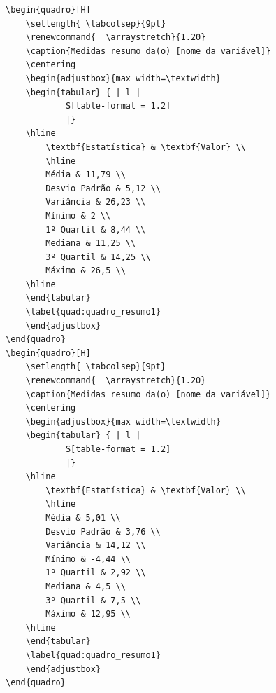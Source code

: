 \documentclass[
  portuguese,
]{estat/estat}
\begin{document}
\begin{verbatim}
\begin{quadro}[H]
    \setlength{ \tabcolsep}{9pt}
    \renewcommand{  \arraystretch}{1.20}
    \caption{Medidas resumo da(o) [nome da variável]}
    \centering
    \begin{adjustbox}{max width=\textwidth}
    \begin{tabular} { | l |
            S[table-format = 1.2]
            |}
    \hline
        \textbf{Estatística} & \textbf{Valor} \\
        \hline
        Média & 11,79 \\
        Desvio Padrão & 5,12 \\
        Variância & 26,23 \\
        Mínimo & 2 \\
        1º Quartil & 8,44 \\
        Mediana & 11,25 \\
        3º Quartil & 14,25 \\
        Máximo & 26,5 \\
    \hline
    \end{tabular}
    \label{quad:quadro_resumo1}
    \end{adjustbox}
\end{quadro}
\begin{quadro}[H]
    \setlength{ \tabcolsep}{9pt}
    \renewcommand{  \arraystretch}{1.20}
    \caption{Medidas resumo da(o) [nome da variável]}
    \centering
    \begin{adjustbox}{max width=\textwidth}
    \begin{tabular} { | l |
            S[table-format = 1.2]
            |}
    \hline
        \textbf{Estatística} & \textbf{Valor} \\
        \hline
        Média & 5,01 \\
        Desvio Padrão & 3,76 \\
        Variância & 14,12 \\
        Mínimo & -4,44 \\
        1º Quartil & 2,92 \\
        Mediana & 4,5 \\
        3º Quartil & 7,5 \\
        Máximo & 12,95 \\
    \hline
    \end{tabular}
    \label{quad:quadro_resumo1}
    \end{adjustbox}
\end{quadro}
\end{verbatim}
\end{document}
